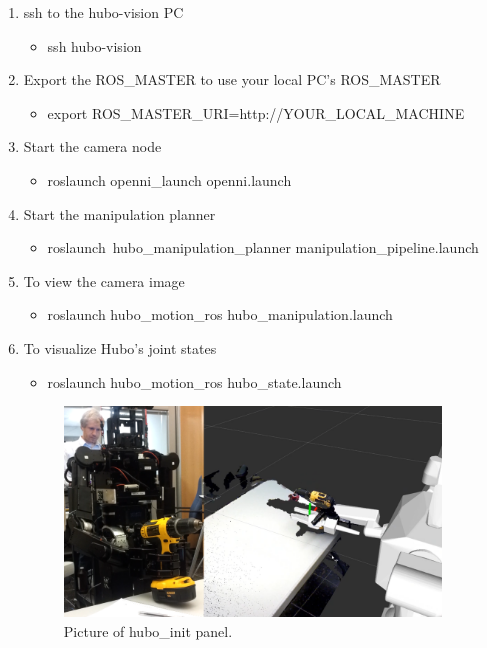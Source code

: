 \documentclass[letterpaper, 10 pt]{report}
\begin{document}
\begin{enumerate}
  \item ssh to the hubo-vision PC
    \begin{itemize}
      \item ssh hubo-vision
    \end{itemize}
  \item Export the ROS\_MASTER to use your local PC's ROS\_MASTER
    \begin{itemize}
      \item export ROS\_MASTER\_URI=http://YOUR\_LOCAL\_MACHINE
    \end{itemize}
  \item Start the camera node
    \begin{itemize}
      \item roslaunch openni\_launch openni.launch
    \end{itemize}
  \item Start the manipulation planner
    \begin{itemize} 
      \item roslaunch\ hubo\_manipulation\_planner manipulation\_pipeline.launch
    \end{itemize}
  \item To view the camera image
    \begin{itemize}
      \item roslaunch hubo\_motion\_ros hubo\_manipulation.launch
    \end{itemize}
  \item To visualize Hubo's joint states
    \begin{itemize}
      \item roslaunch hubo\_motion\_ros hubo\_state.launch
    \end{itemize}
    \begin{figure}[ht]
    \centering
    \includegraphics[width=10.0cm]{resources/pickup-drill-rviz}
    \caption{Picture of hubo\_init panel.}
    \label{fig:pickup-drill-rviz-image}
    \end{figure}
\end{enumerate}
\end{document}
